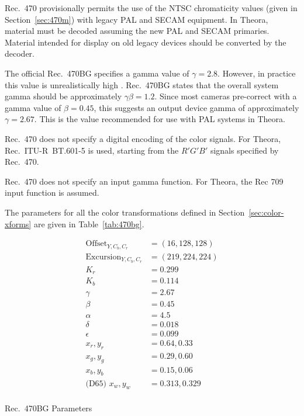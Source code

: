 \documentclass[11pt,letterpaper]{book}
\numberwithin{equation}{chapter}
\numberwithin{figure}{chapter}
\numberwithin{table}{chapter}
\begin{document}
Rec.~470 provisionally permits the use of the NTSC chromaticity values (given
 in Section~\ref{sec:470m}) with legacy PAL and SECAM equipment.
In Theora, material must be decoded assuming the new PAL and SECAM primaries.
Material intended for display on old legacy devices should be converted by the
 decoder.

The official Rec.~470BG specifies a gamma value of $\gamma=2.8$.
However, in practice this value is unrealistically high \cite{Poyn97}.
Rec.~470BG states that the overall system gamma should be approximately
 $\gamma\beta=1.2$.
Since most cameras pre-correct with a gamma value of $\beta=0.45$,
 this suggests an output device gamma of approximately $\gamma=2.67$.
This is the value recommended for use with PAL systems in Theora.

Rec.~470 does not specify a digital encoding of the color signals.
For Theora, Rec.~ITU-R~BT.601-5 \cite{rec601} is used, starting from the
 $R'G'B'$ signals specified by Rec.~470.

Rec.~470 does not specify an input gamma function.
For Theora, the Rec 709 \cite{rec709} input function is assumed.

The parameters for all the color transformations defined in
 Section~\ref{sec:color-xforms} are given in Table~\ref{tab:470bg}.

\begin{table}[htb]
\begin{align*}
\mathrm{Offset}_{Y,C_b,C_r}    & = (16, 128, 128)  \\
\mathrm{Excursion}_{Y,C_b,C_r} & = (219, 224, 224) \\
K_r                            & = 0.299           \\
K_b                            & = 0.114           \\
\gamma                         & = 2.67            \\
\beta                          & = 0.45            \\
\alpha                         & = 4.5             \\
\delta                         & = 0.018           \\
\epsilon                       & = 0.099           \\
x_r,y_r                        & = 0.64, 0.33      \\
x_g,y_g                        & = 0.29, 0.60      \\
x_b,y_b                        & = 0.15, 0.06      \\
\text{(D65) } x_w,y_w          & = 0.313, 0.329    \\
\end{align*}
\caption{Rec.~470BG Parameters}
\label{tab:470bg}
\end{table}
\end{document}
